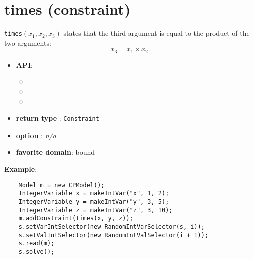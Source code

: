 \label{times}
\hypertarget{times}{}

\section{times (constraint)}\label{times:timesconstraint}\hypertarget{times:timesconstraint}{}
\begin{notedef}
  \texttt{times}$(x_1, x_2, x_3)$ states that the third argument is equal to the product of the two arguments:
$$x_3=x_1\times x_2.$$
\end{notedef}

\begin{itemize}
	\item \textbf{API}:
	\begin{itemize}
		\item {}
		\item {}
		\item {}
	\end{itemize}
	\item \textbf{return type} : \texttt{Constraint}
	\item \textbf{option} : \emph{n/a}
	\item \textbf{favorite domain}: bound
\end{itemize}

\textbf{Example}:
\begin{lstlisting}
	Model m = new CPModel();
	IntegerVariable x = makeIntVar("x", 1, 2);
	IntegerVariable y = makeIntVar("y", 3, 5);
	IntegerVariable z = makeIntVar("z", 3, 10);
	m.addConstraint(times(x, y, z));
	s.setVarIntSelector(new RandomIntVarSelector(s, i));
	s.setValIntSelector(new RandomIntValSelector(i + 1));
	s.read(m);
	s.solve();
\end{lstlisting}


